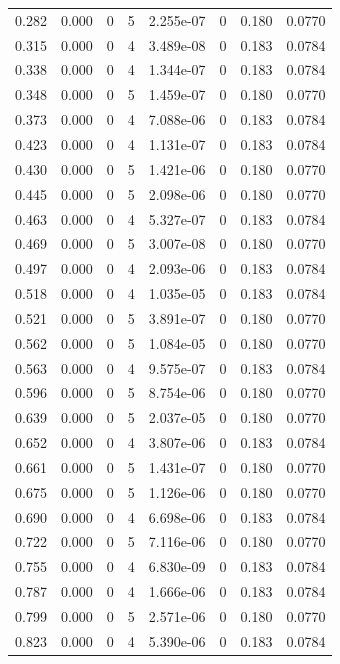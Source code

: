 \documentclass[preview]{standalone}
\begin{document}
{{\begin{tabular}{L{1.2cm}C{1.2cm} C{0.3cm}C{0.5cm} C{1.4cm}C{1.4cm} C{1.4cm}C{1.4cm}}
  0.282  &  0.000  & 0     &  5 &  2.255e-07  & 0  & 0.180 &  0.0770   \\ 
  0.315  &  0.000  & 0     &  4 &  3.489e-08  & 0  & 0.183 &  0.0784   \\ 
  0.338  &  0.000  & 0     &  4 &  1.344e-07  & 0  & 0.183 &  0.0784   \\ 
  0.348  &  0.000  & 0     &  5 &  1.459e-07  & 0  & 0.180 &  0.0770   \\ 
  0.373  &  0.000  & 0     &  4 &  7.088e-06  & 0  & 0.183 &  0.0784   \\ 
  0.423  &  0.000  & 0     &  4 &  1.131e-07  & 0  & 0.183 &  0.0784   \\ 
  0.430  &  0.000  & 0     &  5 &  1.421e-06  & 0  & 0.180 &  0.0770   \\ 
  0.445  &  0.000  & 0     &  5 &  2.098e-06  & 0  & 0.180 &  0.0770   \\ 
  0.463  &  0.000  & 0     &  4 &  5.327e-07  & 0  & 0.183 &  0.0784   \\ 
  0.469  &  0.000  & 0     &  5 &  3.007e-08  & 0  & 0.180 &  0.0770   \\ 
  0.497  &  0.000  & 0     &  4 &  2.093e-06  & 0  & 0.183 &  0.0784   \\ 
  0.518  &  0.000  & 0     &  4 &  1.035e-05  & 0  & 0.183 &  0.0784   \\ 
  0.521  &  0.000  & 0     &  5 &  3.891e-07  & 0  & 0.180 &  0.0770   \\ 
  0.562  &  0.000  & 0     &  5 &  1.084e-05  & 0  & 0.180 &  0.0770   \\ 
  0.563  &  0.000  & 0     &  4 &  9.575e-07  & 0  & 0.183 &  0.0784   \\ 
  0.596  &  0.000  & 0     &  5 &  8.754e-06  & 0  & 0.180 &  0.0770   \\ 
  0.639  &  0.000  & 0     &  5 &  2.037e-05  & 0  & 0.180 &  0.0770   \\ 
  0.652  &  0.000  & 0     &  4 &  3.807e-06  & 0  & 0.183 &  0.0784   \\ 
  0.661  &  0.000  & 0     &  5 &  1.431e-07  & 0  & 0.180 &  0.0770   \\ 
  0.675  &  0.000  & 0     &  5 &  1.126e-06  & 0  & 0.180 &  0.0770   \\ 
  0.690  &  0.000  & 0     &  4 &  6.698e-06  & 0  & 0.183 &  0.0784   \\ 
  0.722  &  0.000  & 0     &  5 &  7.116e-06  & 0  & 0.180 &  0.0770   \\ 
  0.755  &  0.000  & 0     &  4 &  6.830e-09  & 0  & 0.183 &  0.0784   \\ 
  0.787  &  0.000  & 0     &  4 &  1.666e-06  & 0  & 0.183 &  0.0784   \\ 
  0.799  &  0.000  & 0     &  5 &  2.571e-06  & 0  & 0.180 &  0.0770   \\ 
  0.823  &  0.000  & 0     &  4 &  5.390e-06  & 0  & 0.183 &  0.0784   \\ 
\hline 
\end{tabular} 

}}
\end{document}
